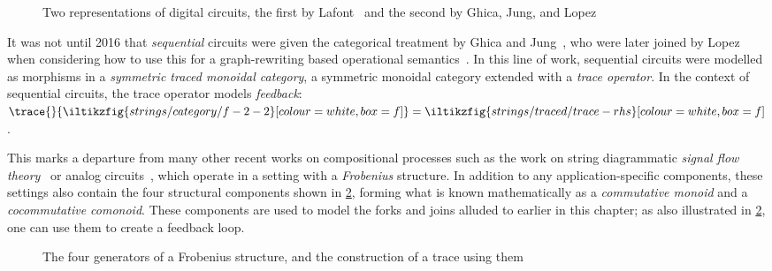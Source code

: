 \begin{figure}
    \centering
    \qquad
    \caption{
        Two representations of digital circuits, the first by
        Lafont~\cite{lafont2003algebraic} and the second by Ghica, Jung, and
        Lopez~\cite{ghica2016categorical,ghica2017diagrammatic}
    }
    \label{fig:history}
\end{figure}

It was not until 2016 that \emph{sequential} circuits were given the
categorical treatment by Ghica and Jung~\cite{ghica2016categorical}, who were
later joined by Lopez when considering how to use this for a graph-rewriting
based operational semantics~\cite{ghica2017diagrammatic}.
In this line of work, sequential circuits were modelled as morphisms in a
\emph{symmetric traced monoidal category}, a symmetric monoidal category
extended with a \emph{trace operator}.
In the context of sequential circuits, the trace operator models
\emph{feedback}: \(
\trace{}{
    \iltikzfig{strings/category/f-2-2}[colour=white,box=f]
}
=
\iltikzfig{strings/traced/trace-rhs}[colour=white,box=f]
\).

This marks a departure from many other recent works on compositional processes
such as the work on string diagrammatic
\emph{signal flow theory}~\cite{bonchi2021survey} or analog
circuits~\cite{boisseau2022string}, which operate in a setting with a
\emph{Frobenius} structure.
In addition to any application-specific components, these settings also contain
the four structural components shown in \cref{fig:frob}, forming what is known
mathematically as a \emph{commutative monoid} and a
\emph{cocommutative comonoid}.
These components are used to model the forks and joins alluded to earlier in
this chapter; as also illustrated in \cref{fig:frob}, one can use them to create
a feedback loop.

\begin{figure}
    \centering
    \quad
    \quad
    \quad
    \qquad
    \caption{
        The four generators of a Frobenius structure, and the construction of
        a trace using them
    }
    \label{fig:frob}
\end{figure}

